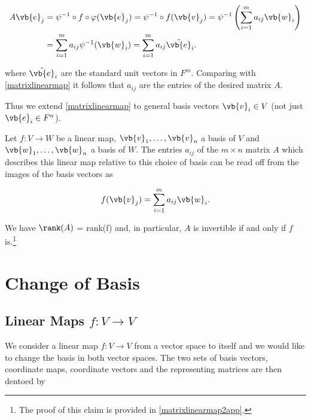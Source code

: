 \documentclass[a4paper,12pt]{report}
\begin{document}
\begin{equation}  
    \begin{aligned}
    A\vb{e} _{j} &= \psi ^{-1} \circ f \circ \varphi (\vb{e} _{j} ) =\psi ^{-1} \circ f(\vb{v} _{j} ) = \psi ^{-1} \left( \sum_{i=1}^{m} a_{ij}\vb{w} _{i}   \right) \\ &= \sum_{i=1}^{m} a_{ij} \psi ^{-1} (\vb{w} _{i} ) = \sum_{i=1}^{m} a_{ij}\tilde{\vb{e} }_{i}.     
    \end{aligned}
\end{equation}

where \(\tilde{\vb{e} }_{i}  \) are the standard unit vectors in \(F^{m} \). Comparing with \cref{matrixlinearmap} it follows that \(a_{ij} \) are the entries of the desired matrix \(A\).

Thus we extend \cref{matrixlinearmap} to general basis vectors \(\vb{v}_{i}  \in  V\) (not just \(\vb{e} _{i} \in F^{n}\)).   

\begin{lemma} \label{matrixlinearmap2} 
Let \(f:V \rightarrow W\) be a linear map, \(\vb{v}_{1}, \ldots, \vb{v}_n \) a basis of \(V\) and \(\vb{w}_{1}, \ldots, \vb{w}_n \) a basis of \(W\). The entries \(a_{ij} \) of the \(m \times n\) matrix \(A\) which describes this linear map relative to this choice of basis can be read off from the images of the basis vectors as 

\begin{equation}
    f(\vb{v} _{j} ) = \sum_{i=1}^{m} a_{ij}\vb{w} _{i} . 
\end{equation}

We have \(\rank (A)\) = rank(f) and, in particular, \(A\) is invertible if and only if \(f\) is.\footnote{The proof of this claim is provided in \cref{matrixlinearmap2app}.} 

\end{lemma}

\section{Change of Basis}

\subsection{Linear Maps \(f:V \rightarrow V\)}

We consider a linear map \(f:V \rightarrow V\) from a vector space to itself and we would like to change the basis in both vector spaces. The two sets of basis vectors, coordinate maps, coordinate vectors and the representing matrices are then dentoed by
\end{document}
